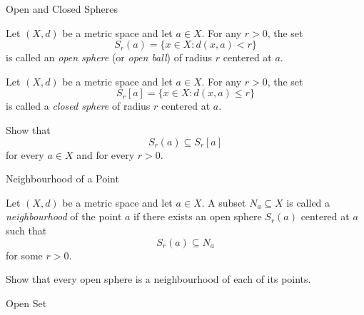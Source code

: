 \documentclass[12pt, a4paper]{article}
\begin{document}
\FrontPage
\Large


\begin{heading}
    Open and Closed Spheres
\end{heading}

\vspace{10pt}

\begin{definition}
Let $(X,d)$ be a metric space and let $a \in X$. For any $r>0$, the set
\[
S_r(a)=\{x\in X : d(x,a)<r\}
\]
is called an \emph{open sphere} (or \emph{open ball}) of radius $r$ centered at $a$.
\end{definition}

\clearpage

\begin{definition}
Let $(X,d)$ be a metric space and let $a \in X$. For any $r>0$, the set
\[
S_r[a]=\{x\in X : d(x,a)\le r\}
\]
is called a \emph{closed sphere} of radius $r$ centered at $a$.
\end{definition}

\vspace{300pt}

\begin{problem}
Show that
\[
S_r(a)\subseteq S_r[a]
\]
for every $a\in X$ and for every $r>0$.
\end{problem}

\clearpage

\begin{heading}
    Neighbourhood of a Point
\end{heading}

\vspace{10pt}

\begin{definition}
Let $(X,d)$ be a metric space and let $a\in X$. A subset $N_a\subseteq X$ is called a
\emph{neighbourhood} of the point $a$ if there exists an open sphere $S_r(a)$ centered at $a$
such that
\[
S_r(a)\subseteq N_a
\]
for some $r>0$.
\end{definition}

\clearpage

\begin{problem}
Show that every open sphere is a neighbourhood of each of its points.
\end{problem}

\clearpage

\begin{heading}
    Open Set
\end{heading}
\end{document}
